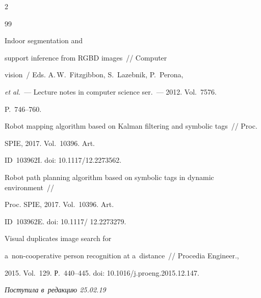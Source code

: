 \begin{multicols}{2}
{{\begin{thebibliography}{99}

 Indoor segmentation and 

support inference from RGBD images~// Computer 

vision~/ Eds. A.\,W.~Fitzgibbon, S.~Lazebnik, P.~Perona,

\textit{et al.}~--- Lecture notes in computer science ser.~--- 2012. Vol.~7576.  

P.~746--760.



Robot mapping algorithm based on Kalman filtering and symbolic tags~// Proc. 

SPIE, 2017. Vol.~10396. Art. 

ID~103962I. doi: 10.1117/12.2273562.



Robot path planning algorithm based on symbolic tags in dynamic environment~// 

Proc. SPIE, 2017. Vol.~10396. Art. 

ID~103962E. doi: 10.1117/ 12.2273279.


 Visual duplicates image search for  

a~non-cooperative person recognition at a~distance~// Procedia Engineer., 

2015. Vol.~129. Р.~440--445. doi: 10.1016/j.proeng.2015.12.147.

 \end{thebibliography}



 }

 }



\end{multicols}



\vspace*{-3pt}



\hfill{\small\textit{Поступила в~редакцию 25.02.19}}



\vspace*{8pt}



